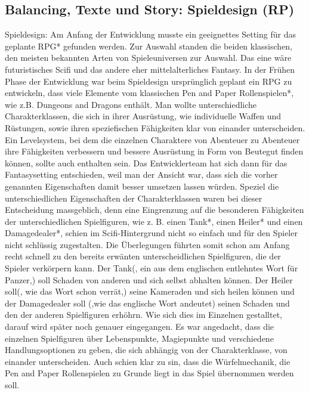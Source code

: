 

\subsection{Balancing, Texte und Story: Spieldesign (RP)}



Spieldesign: Am Anfang der Entwicklung musste ein geeignettes Setting für das geplante RPG* gefunden werden. Zur Auswahl standen die beiden klassischen, den meisten bekannten Arten von Spieleuniversen zur Auswahl. Das eine wäre futuristisches Scifi und das andere eher mittelalterliches Fantasy. In der Frühen Phase der Entwicklung war beim Spieldesign ursprünglich geplant ein RPG zu entwickeln, dass viele Elemente vom klassischen Pen and Paper Rollenspielen*, wie z.B. Dungeons and Dragons enthält. Man wollte unterschiedliche Charakterklassen, die sich in ihrer Ausrüstung, wie individuelle Waffen und Rüstungen, sowie ihren speziefischen Fähigkeiten klar von einander unterscheiden. Ein Levelsystem, bei dem die einzelnen Charaktere von Abenteuer zu Abenteuer ihre Fähigkeiten verbessern und bessere Ausrüstung in Form von Beutegut finden können, sollte auch enthalten sein. Das Entwicklerteam hat sich dann für das Fantasysetting entschieden, weil man der Ansicht war, dass sich die vorher genannten Eigenschaften damit besser umsetzen lassen würden. Speziel die unterschiedlichen Eigenschaften der Charakterklassen waren bei dieser Entscheidung massgeblich, denn eine Eingrenzung auf die besonderen Fähigkeiten der unterschiedlichen Spielfiguren, wie z. B. einen Tank*, einen Heiler* und einen Damagedealer*, schien im Scifi-Hintergrund nicht so einfach und für den Spieler nicht schlüssig zugestalten.
Die Überlegungen führten somit schon am Anfang recht schnell zu den bereits erwänten unterscheidlichen Spielfiguren, die der Spieler verkörpern kann. Der Tank(, ein aus dem englischen entlehntes Wort für Panzer,) soll Schaden von anderen und sich selbst abhalten können. Der Heiler soll(, wie das Wort schon verrät,) seine Kameraden und sich heilen können und der Damagedealer soll (,wie das englische Wort andeutet) seinen Schaden und den der anderen Spielfiguren erhöhrn. Wie sich dies im Einzelnen gestalltet, darauf wird später noch genauer eingegangen. Es war angedacht, dass die einzelnen Spielfiguren über Lebenspunkte, Magiepunkte und verschiedene Handlungsoptionen zu geben, die sich abhängig von der Charakterklasse, von einander unterscheiden. 
Auch schien klar zu sin, dass die Würfelmechanik, die Pen and Paper Rollenspielen zu Grunde liegt in das Spiel übernommen werden soll.
